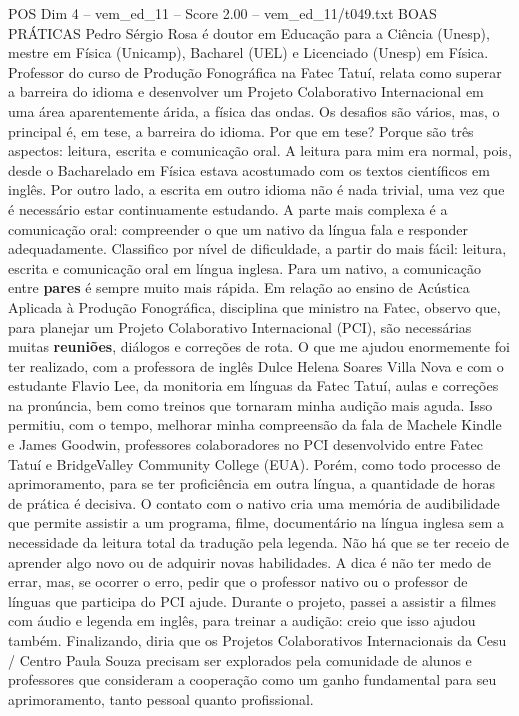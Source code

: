 \begin{textsample}{POS Dim 4 – vem\_ed\_11 – Score 2.00 – vem\_ed\_11/t049.txt}  \label{ex:f4_pos_166}
BOAS PRÁTICAS Pedro Sérgio Rosa é doutor em Educação para a Ciência (Unesp), mestre em Física (Unicamp), Bacharel (UEL) e Licenciado (Unesp) em Física.
Professor do curso de Produção Fonográfica na Fatec Tatuí, relata como superar a barreira do idioma e desenvolver um Projeto Colaborativo Internacional em uma área aparentemente árida, a física das ondas.
Os desafios são vários, mas, o principal é, em tese, a barreira do idioma.
Por que em tese?
Porque são três aspectos: leitura, escrita e comunicação oral.
A leitura para mim era normal, pois, desde o Bacharelado em Física estava acostumado com os textos científicos em inglês.
Por outro lado, a escrita em outro idioma não é nada trivial, uma vez que é necessário estar continuamente estudando.
A parte mais complexa é a comunicação oral: compreender o que um nativo da língua fala e responder adequadamente.
Classifico por nível de dificuldade, a partir do mais fácil: leitura, escrita e comunicação oral em língua inglesa.
Para um nativo, a comunicação entre \textbf{pares} é sempre muito mais rápida.
Em relação ao ensino de Acústica Aplicada à Produção Fonográfica, disciplina que ministro na Fatec, observo que, para planejar um Projeto Colaborativo Internacional (PCI), são necessárias muitas \textbf{reuniões}, diálogos e correções de rota.
O que me ajudou enormemente foi ter realizado, com a professora de inglês Dulce Helena Soares Villa Nova e com o estudante Flavio Lee, da monitoria em línguas da Fatec Tatuí, aulas e correções na pronúncia, bem como treinos que tornaram minha audição mais aguda.
Isso permitiu, com o tempo, melhorar minha compreensão da fala de Machele Kindle e James Goodwin, professores colaboradores no PCI desenvolvido entre Fatec Tatuí e BridgeValley Community College (EUA).
Porém, como todo processo de aprimoramento, para se ter proficiência em outra língua, a quantidade de horas de prática é decisiva.
O contato com o nativo cria uma memória de audibilidade que permite assistir a um programa, filme, documentário na língua inglesa sem a necessidade da leitura total da tradução pela legenda.
Não há que se ter receio de aprender algo novo ou de adquirir novas habilidades.
A dica é não ter medo de errar, mas, se ocorrer o erro, pedir que o professor nativo ou o professor de línguas que participa do PCI ajude.
Durante o projeto, passei a assistir a filmes com áudio e legenda em inglês, para treinar a audição: creio que isso ajudou também.
Finalizando, diria que os Projetos Colaborativos Internacionais da Cesu / Centro Paula Souza precisam ser explorados pela comunidade de alunos e professores que consideram a cooperação como um ganho fundamental para seu aprimoramento, tanto pessoal quanto profissional.

\end{textsample}

